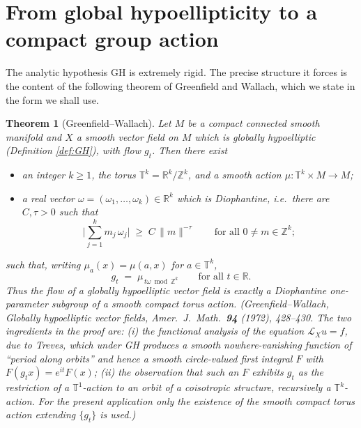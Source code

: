 \documentclass[11pt]{article}
\newtheorem{theorem}{Theorem}[section]
\theoremstyle{definition}
\newcommand{\calL}{\mathcal{L}}
\newcommand{\TT}{\mathbb{T}}
\newcommand{\RR}{\mathbb{R}}
\newcommand{\ZZ}{\mathbb{Z}}
\begin{document}
\section{From global hypoellipticity to a compact group action}
\label{sec:GHtostruct}

The analytic hypothesis GH is extremely rigid. The precise structure it
forces is the content of the following theorem of Greenfield and Wallach,
which we state in the form we shall use.


\begin{theorem}[Greenfield--Wallach]\label{thm:GW}
Let $M$ be a compact connected smooth manifold and $X$ a smooth vector
field on $M$ which is globally hypoelliptic \textup{(}Definition
\ref{def:GH}\textup{)}, with flow $g_t$. Then there exist
\begin{itemize}[leftmargin=2.5em]
  \item an integer $k \ge 1$, the torus $\TT^k = \RR^k / \ZZ^k$, and a
        smooth action $\mu : \TT^k \times M \to M$;
  \item a real vector $\omega = (\omega_1,\dots,\omega_k) \in \RR^k$ which
        is \emph{Diophantine}, i.e.\ there are $C, \tau > 0$ such that
        \[
        \Big|\sum_{j=1}^{k} m_j\,\omega_j\Big|
        \;\ge\; C\,\|m\|^{-\tau}
        \qquad\text{for all } 0 \neq m \in \ZZ^k ;
        \]
\end{itemize}
such that, writing $\mu_a(x) = \mu(a,x)$ for $a \in \TT^k$,
\[
g_t \;=\; \mu_{\,t\omega \bmod \ZZ^k}
\qquad\text{for all } t \in \RR .
\]
Thus the flow of a globally hypoelliptic vector field is exactly a
Diophantine one-parameter subgroup of a smooth compact torus action.
\textup{(}Greenfield--Wallach, \emph{Globally hypoelliptic vector
fields}, Amer.~J.~Math.~\textbf{94} (1972), 428--430. The two ingredients
in the proof are: (i) the functional analysis of the equation
$\calL_X u = f$, due to Treves, which under GH produces a smooth
nowhere-vanishing function of ``period along orbits'' and hence a smooth
circle-valued first integral $F$ with $F(g_t x) = e^{it} F(x)$; (ii) the
observation that such an $F$ exhibits $g_t$ as the restriction of a
$\TT^1$-action to an orbit of a coisotropic structure, recursively a
$\TT^k$-action. For the present application only the \emph{existence of
the smooth compact torus action extending $\{g_t\}$} is
used.\textup{)}
\end{theorem}
\end{document}
